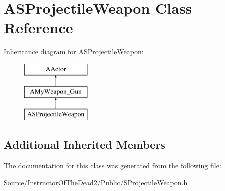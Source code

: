\hypertarget{class_a_s_projectile_weapon}{}\section{A\+S\+Projectile\+Weapon Class Reference}
\label{class_a_s_projectile_weapon}
Inheritance diagram for A\+S\+Projectile\+Weapon\+:\begin{figure}[H]
\begin{center}
\leavevmode
\includegraphics[height=3.000000cm]{class_a_s_projectile_weapon}
\end{center}
\end{figure}
\subsection*{Additional Inherited Members}


The documentation for this class was generated from the following file\+:\begin{DoxyCompactItemize}
\item 
Source/\+Instructor\+Of\+The\+Dead2/\+Public/S\+Projectile\+Weapon.\+h\end{DoxyCompactItemize}
